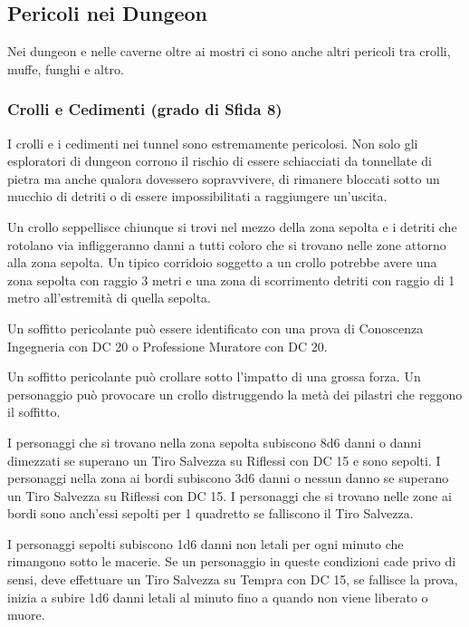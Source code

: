 \begin{multicols}{2}
\subsection{Pericoli nei Dungeon}

Nei dungeon e nelle caverne oltre ai mostri ci sono anche altri pericoli tra crolli, muffe, funghi e altro.

\subsubsection{Crolli e Cedimenti (grado di Sfida 8)}

I crolli e i cedimenti nei tunnel sono estremamente pericolosi. Non solo gli esploratori di dungeon corrono il rischio di essere schiacciati da tonnellate di pietra ma anche qualora dovessero sopravvivere, di rimanere bloccati sotto un mucchio di detriti o di essere impossibilitati a raggiungere un'uscita.

Un crollo seppellisce chiunque si trovi nel mezzo della zona sepolta e i detriti che rotolano via infliggeranno danni a tutti coloro che si trovano nelle zone attorno alla zona sepolta. Un tipico corridoio soggetto a un crollo potrebbe avere una zona sepolta con raggio 3 metri e una zona di scorrimento detriti con raggio di 1 metro all'estremità di quella sepolta.

Un soffitto pericolante può essere identificato con una prova di Conoscenza Ingegneria con DC 20 o Professione Muratore con DC 20.

Un soffitto pericolante può crollare sotto l'impatto di una grossa forza. Un personaggio può provocare un crollo distruggendo la metà dei pilastri che reggono il soffitto.

I personaggi che si trovano nella zona sepolta subiscono 8d6 danni o danni dimezzati se superano un Tiro Salvezza su Riflessi con DC 15 e sono sepolti. I personaggi nella zona ai bordi subiscono 3d6 danni o nessun danno se superano un Tiro Salvezza su Riflessi con DC 15. I personaggi che si trovano nelle zone ai bordi sono anch'essi sepolti per 1 quadretto se falliscono il Tiro Salvezza.

I personaggi sepolti subiscono 1d6 danni non letali per ogni minuto che rimangono sotto le macerie. Se un personaggio in queste condizioni cade privo di sensi, deve effettuare un Tiro Salvezza su Tempra con DC 15, se fallisce la prova, inizia a subire 1d6 danni letali al minuto fino a quando non viene liberato o muore.


\end{multicols}

